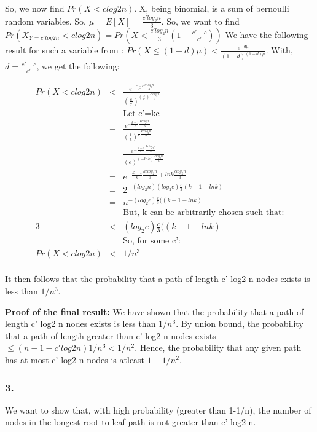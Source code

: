\documentclass[10pt]{article}
\begin{document}
So, we now find $Pr(X<c log2 n)$. X, being binomial, is a sum of bernoulli random variables. So, $\mu=E[X]=\frac{c'log_{2} n}{3}$. So, we want to find $Pr(X_{Y = c' log2 n}<c log2 n) = Pr(X<\frac{c'log_{2} n}{3}(1-\frac{c'-c}{c'}))$ We have the following result for such a variable from \cite{mitzenmacherUpfal}: $Pr(X \leq (1-d)\mu) < \frac{e^{-d\mu}}{(1-d)^{(1-d)\mu}}$. With, $d=\frac{c'-c}{c'}$, we get the following:

\begin{eqnarray}
Pr(X<c log2 n) &<& \frac{e^{-\frac{c'-c}{c'}\frac{c'log_{2} n}{3}}}{(\frac{c}{c'})^{(\frac{c}{c'})\frac{c'log_{2} n}{3}}}\\
&& \text{Let c'=kc}\\
&=& \frac{e^{-\frac{k-1}{k}\frac{kclog_{2} n}{3}}}{(\frac{1}{k})^{\frac{1}{k}\frac{kclog_{2} n}{3}}}\\
&=& \frac{e^{-\frac{k-1}{k}\frac{kclog_{2} n}{3}}}{(e)^{(-lnk)\frac{clog_{2} n}{3}}}\\
&=& e^{-\frac{k-1}{k}\frac{kclog_{2} n}{3}+lnk\frac{clog_{2} n}{3}}\\
&=& 2^{-(log_{2}n) (log_{2}e) \frac{c}{3}(k-1-lnk)}\\
&=& n^{-(log_{2}e) \frac{c}{3}((k-1-lnk)}\\
&& \text{But, k can be arbitrarily chosen such that:}\\
3 &<& (log_{2}e) \frac{c}{3}((k-1-lnk)\\
&& \text{So, for some c':}\\
Pr(X<c log2 n) &<& 1/n^{3}\\
\end{eqnarray}

It then follows that the probability that a path of length c' log2 n nodes exists is less than $1/n^{3}$.

\textbf{Proof of the final result:}
We have shown that the probability that a path of length c' log2 n nodes exists is less than $1/n^{3}$. By union bound, the probability that a path of length greater than c' log2 n nodes exists $\leq (n-1-c' log2 n)1/n^{3} < 1/n^{2}$. Hence, the probability that any given path has at most c' log2 n nodes is atleast $1-1/n^{2}$.

\subsubsection{3.} 

We want to show that, with high probability (greater than 1-1/n), the number of nodes in the longest root to leaf path is not greater than c' log2 n.
\end{document}
